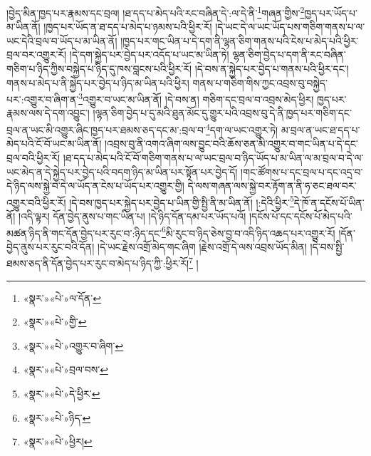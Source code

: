 །བྱེད་མིན་ཁྱད་པར་རྣམས་དང་བྲལ། །ཐ་དད་པ་མེད་པའི་རང་བཞིན་དེ་:ལ་དེ་ནི་\footnote{«སྣར་»«པེ་»ལ་དོན་}གཞན་གྱིས་\footnote{«སྣར་»«པེ་»གྱི་}ཁྱད་པར་ཡོད་པ་མ་ཡིན་ནོ། །ཁྱད་པར་ཡོད་ན་ཐ་དད་པ་མེད་པ་ཉམས་པའི་ཕྱིར་རོ། །དེ་ཡང་དེ་ལ་ཡང་ཡོད་པས་གཅིག་གནས་པ་ལ་ཡང་དེའི་བྲལ་བ་ཡོད་པ་མ་ཡིན་ནོ། །ཁྱད་པར་གང་ཡིན་པ་དེ་དག་ནི་ལྷན་ཅིག་གནས་པའི་ངེས་པ་མེད་པའི་ཕྱིར་བྲལ་བར་འགྱུར་རོ། །དེ་དག་སྐྱེད་པར་བྱེད་པར་འདོད་པ་ཡང་མ་ཡིན་ཏེ། ལྷན་ཅིག་བྱེད་པ་དག་ནི་རང་བཞིན་གཅིག་པ་ཉིད་ཀྱིས་བསྐྱེད་པ་ཉིད་དུ་ཁས་བླངས་པའི་ཕྱིར་རོ། །དེ་བས་ན་སྐྱེད་པར་བྱེད་པ་གནས་པའི་ཕྱིར་དང་། གནས་པ་མེད་པ་ནི་སྐྱེད་པར་བྱེད་པ་ཉིད་མ་ཡིན་པའི་ཕྱིར། གནས་པ་གཅིག་གིས་ཀྱང་འབྲས་བུ་བསྐྱེད་པར་:འགྱུར་བ་ཞིག་ན་\footnote{«སྣར་»«པེ་»འགྱུར་བ་ཞིག་}འགྱུར་བ་ཡང་མ་ཡིན་ནོ། །དེ་བས་ན། གཅིག་དང་བྲལ་བ་འབྲས་མེད་ཕྱིར། ཁྱད་པར་རྣམས་ལས་དེ་དག་འབྱུང་། །ལྷན་ཅིག་བྱེད་པ་དུ་མའི་ཐུན་མོང་དུ་གྱུར་པའི་འབྲས་བུ་དེ་ནི་ཁྱད་པར་གཅིག་དང་བྲལ་ན་ཡང་མི་འགྱུར་ཞིང་ཁྱད་པར་ཐམས་ཅད་དང་མ་:བྲལ་བ་\footnote{«སྣར་»«པེ་»བྲལ་བས་}དག་ལ་ཡང་འགྱུར་ཏེ། མ་བྲལ་ན་ཡང་ཐ་དད་པ་མེད་པའི་ངོ་བོ་ཡང་མ་ཡིན་ནོ། །འབྲས་བུ་ནི་འགའ་ཞིག་ལས་བྱུང་བའི་ཆོས་ཅན་མི་འགྱུར་བ་གང་ཡིན་པ་དེ་དང་བྲལ་བའི་ཕྱིར་རོ། །ཐ་དད་པ་མེད་པའི་ངོ་བོ་གཅིག་གནས་པ་ལ་ཡང་བྲལ་བ་ཉིད་ཡོད་པ་མ་ཡིན་ལ་མ་བྲལ་བ་དེ་ལ་ཡང་མེད་ན་དེ་སྐྱེད་པར་བྱེད་པའི་བདག་ཉིད་མ་ཡིན་པར་སྟོན་པར་བྱེད་དོ། །གང་ཚོགས་པ་དང་བྲལ་པ་དང་འདྲ་བ་དེ་ཉིད་ལས་སྐྱེ་བ་དེ་ལ་ཡོད་ན་ངེས་པ་ཡོད་པར་འགྱུར་གྱི། དེ་ལས་གཞན་ལས་སྐྱེ་བར་རྟོག་ན་ནི་ཧ་ཅང་ཐལ་བར་འགྱུར་བའི་ཕྱིར་རོ། །དེ་བས་ཁྱད་པར་སྐྱེད་པར་བྱེད་པ་ཡིན་གྱི་སྤྱི་ནི་མ་ཡིན་ནོ། །:དེའི་ཕྱིར་\footnote{«སྣར་»«པེ་»དེ་ཕྱིར་}དེ་ཁོ་ན་དངོས་པོ་ཡིན་ནོ། །འདི་ལྟར། དོན་བྱེད་ནུས་པ་གང་ཡིན་པ། །དེ་ཉིད་དོན་དམ་པར་ཡོད་པའོ། །དངོས་པོ་དང་དངོས་པོ་མེད་པའི་མཚན་ཉིད་ནི་གང་དོན་བྱེད་པར་རུང་བ་:ཉིད་དང་\footnote{«སྣར་»«པེ་»ཉིད་}མི་རུང་བ་ཉིད་ཅེས་བྱ་བ་འདི་ཉིད་འཆད་པར་འགྱུར་རོ། །དོན་བྱེད་ནུས་པར་རུང་བའི་དོན། །དེ་ཡང་རྗེས་འགྲོ་མེད་གང་ཞིག །རྗེས་འགྲོ་དེ་ལས་འབྲས་ཡོད་མིན། །དེ་བས་སྤྱི་ཐམས་ཅད་ནི་དོན་བྱེད་པར་རུང་བ་མེད་པ་ཉིད་ཀྱི་:ཕྱིར་རོ།\footnote{«སྣར་»«པེ་»ཕྱིར།} །
